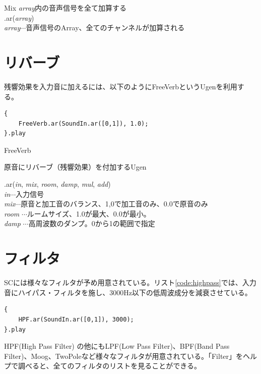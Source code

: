 \documentclass{jsarticle}
\begin{document}
\begin{itembox}[l]{Mix}
{\footnotesize 
{\it array}内の音声信号を全て加算する\\
.ar({\it array})\\
{\it array}$\cdots$音声信号のArray、全てのチャンネルが加算される\\
}
\end{itembox}

\section{リバーブ}
残響効果を入力音に加えるには、以下のようにFreeVerbというUgenを利用する。

\begin{lstlisting}[caption=リバーブ, label=code:reverb]
{
	FreeVerb.ar(SoundIn.ar([0,1]), 1.0);
}.play
\end{lstlisting}

\begin{itembox}[l]{FreeVerb}
{\footnotesize 
原音にリバーブ（残響効果）を付加するUgen

.ar({\it in}, {\it mix}, {\it room}, {\it damp}, {\it mul}, {\it add})\\

{\it in}$\cdots$入力信号\\
{\it mix}$\cdots$原音と加工音のバランス、1,0で加工音のみ、0.0で原音のみ\\
{\it room} $\cdots$ルームサイズ、1.0が最大、0.0が最小。\\
{\it damp} $\cdots$高周波数のダンプ。0から1の範囲で指定\\
}
\end{itembox}

\section{フィルタ}
SCには様々なフィルタが予め用意されている。リスト\ref{code:highpass}では、入力音にハイパス・フィルタを施し、3000Hz以下の低周波成分を減衰させている。

\begin{lstlisting}[caption=ハイパス・フィルタ, label=code:highpass]
{
	HPF.ar(SoundIn.ar([0,1]), 3000);
}.play
\end{lstlisting}

HPF(High Pass Filter) の他にもLPF(Low Pass Filter)、BPF(Band Pass Filter)、Moog、TwoPoleなど様々なフィルタが用意されている。「Filter」をヘルプで調べると、全てのフィルタのリストを見ることができる。
\end{document}
